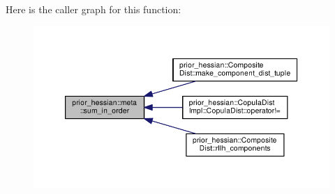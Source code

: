Here is the caller graph for this function\+:\nopagebreak
\begin{figure}[H]
\begin{center}
\leavevmode
\includegraphics[width=350pt]{namespaceprior__hessian_1_1meta_ab09470f06d05f5c58e249a03ef19242f_icgraph}
\end{center}
\end{figure}


